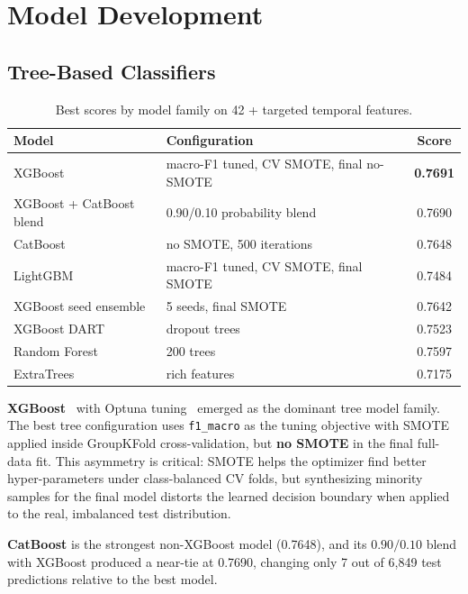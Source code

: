 \documentclass[12pt, a4paper]{article}
\begin{document}
\section{Model Development}

\subsection{Tree-Based Classifiers}

\begin{table}[h]
\centering
\caption{Best scores by model family on 42 + targeted temporal features.}
\label{tab:models}
\begin{tabular}{@{}llc@{}}
\toprule
\textbf{Model} & \textbf{Configuration} & \textbf{Score} \\ \midrule
XGBoost & macro-F1 tuned, CV SMOTE, final no-SMOTE & \textbf{0.7691} \\
XGBoost + CatBoost blend & 0.90/0.10 probability blend & 0.7690 \\
CatBoost & no SMOTE, 500 iterations & 0.7648 \\
LightGBM & macro-F1 tuned, CV SMOTE, final SMOTE & 0.7484 \\
XGBoost seed ensemble & 5 seeds, final SMOTE & 0.7642 \\
XGBoost DART & dropout trees & 0.7523 \\
Random Forest & 200 trees & 0.7597 \\
ExtraTrees & rich features & 0.7175 \\ \bottomrule
\end{tabular}
\end{table}

\textbf{XGBoost}~\cite{chen2016xgboost} with Optuna tuning~\cite{akiba2019optuna} emerged as the dominant tree model family. The best tree configuration uses \texttt{f1\_macro} as the tuning objective with SMOTE applied inside GroupKFold cross-validation, but \textbf{no SMOTE} in the final full-data fit. This asymmetry is critical: SMOTE helps the optimizer find better hyper-parameters under class-balanced CV folds, but synthesizing minority samples for the final model distorts the learned decision boundary when applied to the real, imbalanced test distribution.

\textbf{CatBoost} is the strongest non-XGBoost model (0.7648), and its $0.90/0.10$ blend with XGBoost produced a near-tie at 0.7690, changing only 7 out of 6{,}849 test predictions relative to the best model.
\end{document}

